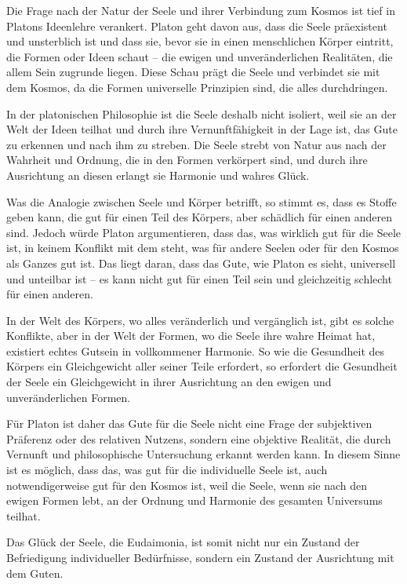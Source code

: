 \documentclass[12pt,a4paper]{article}
\begin{document}
Die Frage nach der Natur der Seele und ihrer Verbindung zum Kosmos ist tief in Platons Ideenlehre verankert. Platon geht davon aus, dass die Seele präexistent und unsterblich ist und dass sie, bevor sie in einen menschlichen Körper eintritt, die Formen oder Ideen schaut – die ewigen und unveränderlichen Realitäten, die allem Sein zugrunde liegen. Diese Schau prägt die Seele und verbindet sie mit dem Kosmos, da die Formen universelle Prinzipien sind, die alles durchdringen.

In der platonischen Philosophie ist die Seele deshalb nicht isoliert, weil sie an der Welt der Ideen teilhat und durch ihre Vernunftfähigkeit in der Lage ist, das Gute zu erkennen und nach ihm zu streben. Die Seele strebt von Natur aus nach der Wahrheit und Ordnung, die in den Formen verkörpert sind, und durch ihre Ausrichtung an diesen erlangt sie Harmonie und wahres Glück.

Was die Analogie zwischen Seele und Körper betrifft, so stimmt es, dass es Stoffe geben kann, die gut für einen Teil des Körpers, aber schädlich für einen anderen sind. Jedoch würde Platon argumentieren, dass das, was wirklich gut für die Seele ist, in keinem Konflikt mit dem steht, was für andere Seelen oder für den Kosmos als Ganzes gut ist. Das liegt daran, dass das Gute, wie Platon es sieht, universell und unteilbar ist – es kann nicht gut für einen Teil sein und gleichzeitig schlecht für einen anderen.

In der Welt des Körpers, wo alles veränderlich und vergänglich ist, gibt es solche Konflikte, aber in der Welt der Formen, wo die Seele ihre wahre Heimat hat, existiert echtes Gutsein in vollkommener Harmonie. So wie die Gesundheit des Körpers ein Gleichgewicht aller seiner Teile erfordert, so erfordert die Gesundheit der Seele ein Gleichgewicht in ihrer Ausrichtung an den ewigen und unveränderlichen Formen.

Für Platon ist daher das Gute für die Seele nicht eine Frage der subjektiven Präferenz oder des relativen Nutzens, sondern eine objektive Realität, die durch Vernunft und philosophische Untersuchung erkannt werden kann. In diesem Sinne ist es möglich, dass das, was gut für die individuelle Seele ist, auch notwendigerweise gut für den Kosmos ist, weil die Seele, wenn sie nach den ewigen Formen lebt, an der Ordnung und Harmonie des gesamten Universums teilhat.

Das Glück der Seele, die Eudaimonia, ist somit nicht nur ein Zustand der Befriedigung individueller Bedürfnisse, sondern ein Zustand der Ausrichtung mit dem Guten.
\end{document}
